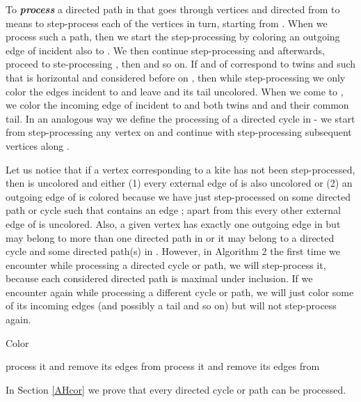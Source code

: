 \documentclass[a4, 11pt]{article}
\newcommand{\<}{\langle}
\renewcommand{\>}{\rangle}
\begin{document}
To {\bf \em process} a directed  path  in  that goes through vertices  and directed from  to  means to step-process each of the vertices  in turn, starting from .
When we process such a path, then we start the step-processing  by coloring an outgoing edge of  incident also to .   We then continue step-processing   and afterwards, proceed to ste-processing , then  and so on. If  and  of  correspond to twins  and  such that  is horizontal and considered before  on , then while step-processing  we only color the edges incident to  and leave  and its tail uncolored. When we come to , we color the incoming edge of  incident to  and both twins  and  and their common tail.
In an analogous way we define the processing of a directed cycle  in  - we start from  step-processing any vertex on  and continue with step-processing subsequent vertices along .

Let us notice that if a vertex  corresponding to a kite  has not been step-processed, then  is uncolored and either (1) every external 
edge of  is also uncolored or (2) an outgoing edge of  is colored because we have just step-processed  on some directed path or cycle  such that  contains an edge ; apart from this every other external edge of  is uncolored. Also, a given vertex   has exactly one outgoing edge in  but may belong to more than one directed path in  or it may belong to a directed cycle and some directed path(s) in .  However, in Algorithm 2  the first time we encounter  while processing a directed cycle or path, we will step-process it, because each considered directed path is maximal under inclusion. If we encounter  again
while processing a different cycle or path, we will just color some of its incoming edges (and possibly a tail and so on) but will not step-process  again.


\begin{algorithm} \label{AH}
	\caption{Color }
	\label{alg:col_h}
	\begin{algorithmic}
	    \State process it and remove its edges from 
	  \EndWhile
	    \State process it and remove its edges from 
	  \EndWhile
		
	\end{algorithmic}
\end{algorithm}

\vspace{0.5cm}




In Section \ref{AHcor} we  prove that every  directed cycle or path can be processed.
\end{document}
